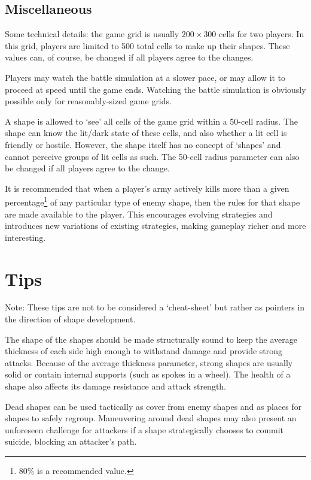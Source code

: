 \documentclass[a4paper,11pt]{article}
\begin{document}
\subsection{Miscellaneous}

Some technical details: the game grid is usually \(200 \times 300\) cells for two players. In this grid, players are limited to 500 total cells to make up their shapes. These values can, of course, be changed if all players agree to the changes.

Players may watch the battle simulation at a slower pace, or may allow it to proceed at speed until the game ends. Watching the battle simulation is obviously possible only for reasonably-sized game grids.

A shape is allowed to `see' all cells of the game grid within a 50-cell radius. The shape can know the lit/dark state of these cells, and also whether a lit cell is friendly or hostile. However, the shape itself has no concept of `shapes' and cannot perceive groups of lit cells as such. The 50-cell radius parameter can also be changed if all players agree to the change.

It is recommended that when a player's army actively kills more than a given percentage\footnote{80\% is a recommended value.} of any particular type of enemy shape, then the rules for that shape are made available to the player. This encourages evolving strategies and introduces new variations of existing strategies, making gameplay richer and more interesting.


\newpage
\section{Tips}

Note: These tips are not to be considered a `cheat-sheet' but rather as pointers in the direction of shape development.

The shape of the shapes should be made structurally sound to keep the average thickness of each side high enough to withstand damage and provide strong attacks. Because of the average thickness parameter, strong shapes are usually solid or contain internal supports (such as spokes in a wheel). The health of a shape also affects its damage resistance and attack strength.

Dead shapes can be used tactically as cover from enemy shapes and as places for shapes to safely regroup. Maneuvering around dead shapes may also present an unforeseen challenge for attackers if a shape strategically chooses to commit suicide, blocking an attacker's path.
\end{document}
